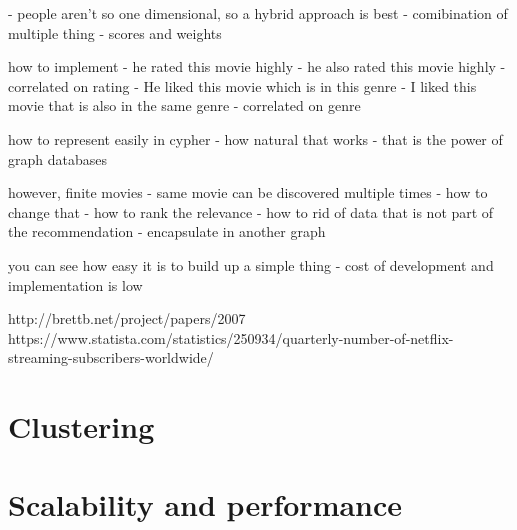 \documentclass[a4paper]{article}
\begin{document}
- people aren't so one dimensional, so a hybrid approach is best
- comibination of multiple thing
- scores and weights 



how to implement
- he rated this movie highly
    - he also rated this movie highly 
    - correlated on rating
- He liked this movie which is in this genre
    - I liked this movie that is also in the same genre
    - correlated on genre

how to represent easily in cypher
- how natural that works
    - that is the power of graph databases

however, finite movies
    - same movie can be discovered multiple times
    - how to change that
    - how to rank the relevance
    - how to rid of data that is not part of the recommendation
        - encapsulate in another graph

you can see how easy it is to build up a simple thing
    - cost of development and implementation is low

http://brettb.net/project/papers/2007%
https://www.statista.com/statistics/250934/quarterly-number-of-netflix-streaming-subscribers-worldwide/
\section{Clustering}
\label{sec:Clustering}

\section{Scalability and performance}
\label{sec:Scalability}
\end{document}
